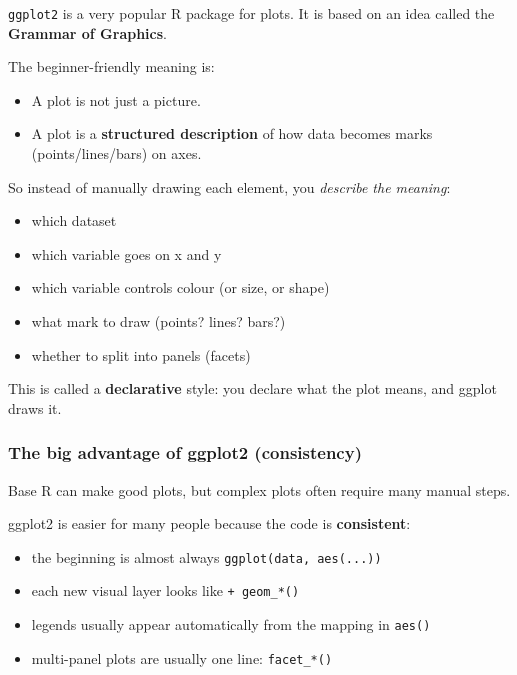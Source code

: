 \documentclass[
  letterpaper,
  DIV=11,
  numbers=noendperiod]{scrartcl}
\providecommand{\tightlist}{%
  \setlength{\itemsep}{0pt}\setlength{\parskip}{0pt}}\usepackage{longtable,booktabs,array}
\begin{document}
\texttt{ggplot2} is a very popular R package for plots. It is based on
an idea called the \textbf{Grammar of Graphics}.

The beginner-friendly meaning is:

\begin{itemize}
\tightlist
\item
  A plot is not just a picture.
\item
  A plot is a \textbf{structured description} of how data becomes marks
  (points/lines/bars) on axes.
\end{itemize}

So instead of manually drawing each element, you \emph{describe the
meaning}:

\begin{itemize}
\tightlist
\item
  which dataset
\item
  which variable goes on x and y
\item
  which variable controls colour (or size, or shape)
\item
  what mark to draw (points? lines? bars?)
\item
  whether to split into panels (facets)
\end{itemize}

This is called a \textbf{declarative} style: you declare what the plot
means, and ggplot draws it.

\subsubsection{The big advantage of ggplot2
(consistency)}\label{the-big-advantage-of-ggplot2-consistency}

Base R can make good plots, but complex plots often require many manual
steps.

ggplot2 is easier for many people because the code is
\textbf{consistent}:

\begin{itemize}
\tightlist
\item
  the beginning is almost always \texttt{ggplot(data,\ aes(...))}
\item
  each new visual layer looks like \texttt{+\ geom\_*()}
\item
  legends usually appear automatically from the mapping in
  \texttt{aes()}
\item
  multi-panel plots are usually one line: \texttt{facet\_*()}
\end{itemize}
\end{document}
